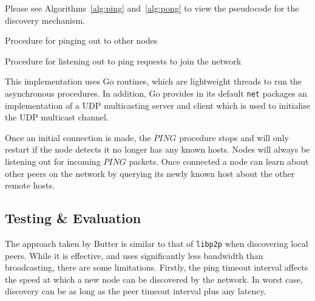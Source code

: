 Please see Algorithms~\ref{alg:ping} and~\ref{alg:pong} to view the pseudocode for the discovery mechanism.

\begin{algorithm}
    \caption{Procedure for pinging out to other nodes}
    \label{alg:ping}
\end{algorithm}

\begin{algorithm}
    \caption{Procedure for listening out to ping requests to join the network}
    \label{alg:pong}
\end{algorithm}


This implementation uses Go routines, which are lightweight threads to run the asynchronous procedures. In addition, Go provides in its default \verb+net+ packages an implementation of a UDP multicasting server and client which is used to initialise the UDP multicast channel.

Once an initial connection is made, the $PING$ procedure stops and will only restart if the node detects it no longer has any known hosts. Nodes will always be listening out for incoming $PING$ packets. Once connected a node can learn about other peers on the network by querying its newly known host about the other remote hosts.

\subsection{Testing \& Evaluation}

The approach taken by Butter is similar to that of \verb+libp2p+ when discovering local peers. While it is effective, and uses significantly less bandwidth than broadcasting, there are some limitations. Firstly, the ping timeout interval affects the speed at which a new node can be discovered by the network. In worst case, discovery can be as long as the peer timeout interval plus any latency.

